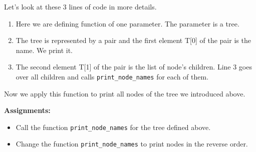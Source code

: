 Let's look at these 3 lines of code in more details.

\begin{leftborder}
\begin{enumerate}
\item Here we are defining function of one parameter. The parameter is a tree.
\item The tree is represented by a pair and the first element T[0] of
the pair is the name. We print it.
\item The second element T[1] of the pair is the list of node's children. 
Line 3 goes over all children and calls
\lstinline{print_node_names} for each of them.
\end{enumerate}
\end{leftborder}

Now we apply this function to print all nodes of the tree we introduced above.
\bigskip
\begin{tcolorbox}
\textbf{Assignments:}
\begin{itemize}
\item Call the function \lstinline{print_node_names}
for the tree defined above. 
\item Change the function \lstinline{print_node_names}
to print nodes in the reverse order.
\end{itemize}
\end{tcolorbox}


